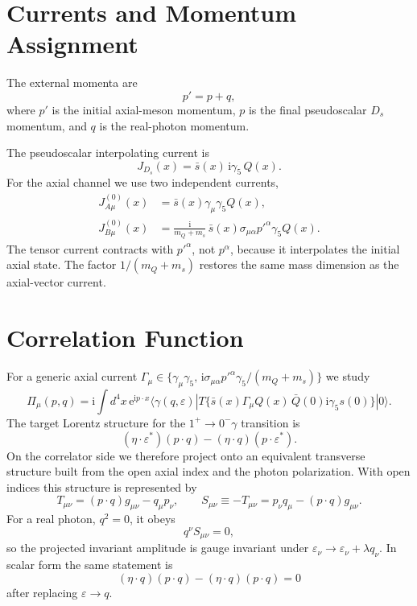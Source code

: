 \documentclass[11pt]{article}
\newcommand{\Ds}{D_s}
\newcommand{\ii}{\mathrm{i}}
\newcommand{\ee}{\mathrm{e}}
\newcommand{\sbar}{\bar s}
\begin{document}
\section{Currents and Momentum Assignment}

The external momenta are
\begin{equation}
  p'=p+q,
\end{equation}
where $p'$ is the initial axial-meson momentum, $p$ is the final pseudoscalar
$\Ds$ momentum, and $q$ is the real-photon momentum.

The pseudoscalar interpolating current is
\begin{equation}
  J_{\Ds}(x)=\sbar(x)\,\ii\gamma_5\,Q(x).
\end{equation}
For the axial channel we use two independent currents,
\begin{align}
  J^{(0)}_{A\mu}(x)
  &= \sbar(x)\gamma_\mu\gamma_5 Q(x),\\
  J^{(0)}_{B\mu}(x)
  &= \frac{\ii}{m_Q+m_s}\,
     \sbar(x)\sigma_{\mu\alpha}p'^\alpha\gamma_5 Q(x).
\end{align}
The tensor current contracts with $p'^\alpha$, not $p^\alpha$, because it
interpolates the initial axial state.  The factor $1/(m_Q+m_s)$ restores the
same mass dimension as the axial-vector current.

\section{Correlation Function}

For a generic axial current $\Gamma_\mu\in\{\gamma_\mu\gamma_5,\,
\ii\sigma_{\mu\alpha}p'^\alpha\gamma_5/(m_Q+m_s)\}$ we study
\begin{equation}
  \Pi_\mu(p,q)
  =
  \ii\int d^4x\,\ee^{\ii p\cdot x}
  \langle \gamma(q,\varepsilon)|
  T\{ \sbar(x)\Gamma_\mu Q(x)\,
       \bar Q(0)\ii\gamma_5 s(0)\}
  |0\rangle .
  \label{eq:correlator}
\end{equation}
The target Lorentz structure for the $1^+\to0^-\gamma$ transition is
\begin{equation}
  (\eta\cdot\varepsilon^*)(p\cdot q)
  -(\eta\cdot q)(p\cdot\varepsilon^*).
\end{equation}
On the correlator side we therefore project onto an equivalent transverse
structure built from the open axial index and the photon polarization.
With open indices this structure is represented by
\begin{equation}
  T_{\mu\nu}=(p\cdot q)g_{\mu\nu}-q_\mu p_\nu,
  \qquad
  S_{\mu\nu}\equiv -T_{\mu\nu}=p_\nu q_\mu-(p\cdot q)g_{\mu\nu}.
\end{equation}
For a real photon, $q^2=0$, it obeys
\begin{equation}
  q^\nu S_{\mu\nu}=0,
\end{equation}
so the projected invariant amplitude is gauge invariant under
$\varepsilon_\nu\to\varepsilon_\nu+\lambda q_\nu$.  In scalar form the same
statement is
\begin{equation}
  (\eta\cdot q)(p\cdot q)-(\eta\cdot q)(p\cdot q)=0
\end{equation}
after replacing $\varepsilon\to q$.
\end{document}
